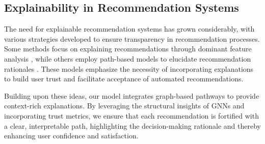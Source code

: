 \subsection{Explainability in Recommendation Systems}
The need for explainable recommendation systems has grown considerably, with various strategies developed to ensure transparency in recommendation processes. Some methods focus on explaining recommendations through dominant feature analysis \cite{zhang2014explicit, tan2016cross, zhang2018visual}, while others employ path-based models to elucidate recommendation rationales \cite{he2015trirank, yu2013cubinet}. These models emphasize the necessity of incorporating explanations to build user trust and facilitate acceptance of automated recommendations.

Building upon these ideas, our model integrates graph-based pathways to provide context-rich explanations. By leveraging the structural insights of GNNs and incorporating trust metrics, we ensure that each recommendation is fortified with a clear, interpretable path, highlighting the decision-making rationale and thereby enhancing user confidence and satisfaction.


